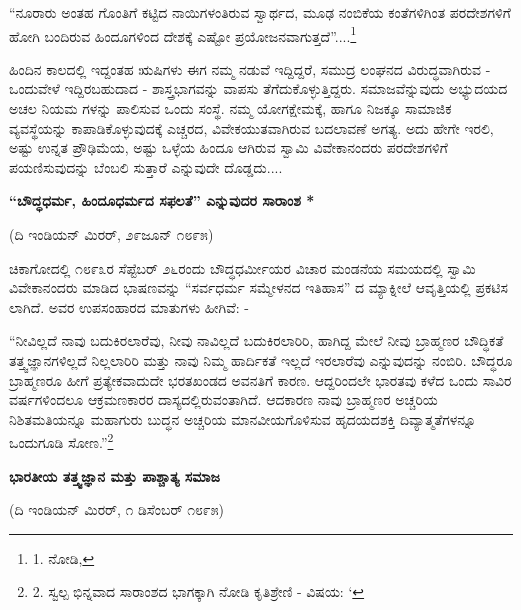“ನೂರಾರು ಅಂತಹ ಗೊಂತಿಗೆ ಕಟ್ಟಿದ ನಾಯಿಗಳಂತಿರುವ ಸ್ವಾರ್ಥದ, ಮೂಢ ನಂಬಿಕೆಯ ಕಂತೆಗಳಿಗಿಂತ ಪರದೇಶಗಳಿಗೆ ಹೋಗಿ ಬಂದಿರುವ ಹಿಂದೂಗಳಿಂದ ದೇಶಕ್ಕೆ ಎಷ್ಟೋ ಪ್ರಯೋಜನವಾಗುತ್ತದೆ”....\footnote{1. ನೋಡಿ, }

ಹಿಂದಿನ ಕಾಲದಲ್ಲಿ ಇದ್ದಂತಹ ಋಷಿಗಳು ಈಗ ನಮ್ಮ ನಡುವೆ ಇದ್ದಿದ್ದರೆ, ಸಮುದ್ರ ಲಂಘನದ ವಿರುದ್ಧವಾಗಿರುವ - ಒಂದುವೇಳೆ ಇದ್ದಿರಬಹುದಾದ - ಶಾಸ್ತ್ರಭಾಗವನ್ನು ವಾಪಸು ತೆಗೆದುಕೊಳ್ಳುತ್ತಿದ್ದರು. ಸಮಾಜವೆನ್ನುವುದು ಅಭ್ಯುದಯದ ಅಚಲ ನಿಯಮ ಗಳನ್ನು ಪಾಲಿಸುವ ಒಂದು ಸಂಸ್ಥೆ. ನಮ್ಮ ಯೋಗಕ್ಷೇಮಕ್ಕೆ, ಹಾಗೂ ನಿಜಕ್ಕೂ ಸಾಮಾಜಿಕ ವ್ಯವಸ್ಥೆಯನ್ನು ಕಾಪಾಡಿಕೊಳ್ಳುವುದಕ್ಕೆ ಎಚ್ಚರದ, ವಿವೇಕಯುತವಾಗಿರುವ ಬದಲಾವಣೆ ಅಗತ್ಯ. ಅದು ಹೇಗೇ ಇರಲಿ, ಅಷ್ಟು ಉನ್ನತ ಪ್ರೌಢಿಮೆಯ, ಅಷ್ಟು ಒಳ್ಳೆಯ ಹಿಂದೂ ಆಗಿರುವ ಸ್ವಾಮಿ ವಿವೇಕಾನಂದರು ಪರದೇಶಗಳಿಗೆ ಪಯಣಿಸುವುದನ್ನು ಬೆಂಬಲಿ ಸುತ್ತಾರೆ ಎನ್ನುವುದೇ ದೊಡ್ಡದು....

\begin{center}
\textbf{“ಬೌದ್ಧಧರ್ಮ, ಹಿಂದೂಧರ್ಮದ ಸಫಲತೆ” ಎನ್ನುವುದರ ಸಾರಾಂಶ *}
\end{center}

\begin{center}
(ದಿ ಇಂಡಿಯನ್ ಮಿರರ್, ೨೯ಜೂನ್ ೧೮೯೫)
\end{center}

ಚಿಕಾಗೋದಲ್ಲಿ ೧೮೯೩ರ ಸೆಪ್ಟೆಬರ್ ೨೬ರಂದು ಬೌದ್ಧಧರ್ಮೀಯರ ವಿಚಾರ ಮಂಡನೆಯ ಸಮಯದಲ್ಲಿ ಸ್ವಾಮಿ ವಿವೇಕಾನಂದರು ಮಾಡಿದ ಭಾಷಣವನ್ನು “ಸರ್ವಧರ್ಮ ಸಮ್ಮೇಳನದ ಇತಿಹಾಸ” ದ ಮ್ಯಾಕ್ನೀಲೆ ಆವೃತ್ತಿಯಲ್ಲಿ ಪ್ರಕಟಿಸ ಲಾಗಿದೆ. ಅವರ ಉಪಸಂಹಾರದ ಮಾತುಗಳು ಹೀಗಿವೆ: -

“ನೀವಿಲ್ಲದೆ ನಾವು ಬದುಕಿರಲಾರೆವು, ನೀವು ನಾವಿಲ್ಲದೆ ಬದುಕಿರಲಾರಿರಿ, ಹಾಗಿದ್ದ ಮೇಲೆ ನೀವು ಬ್ರಾಹ್ಮಣರ ಬೌದ್ಧಿಕತೆ ತತ್ತ್ವಜ್ಞಾನಗಳಿಲ್ಲದೆ ನಿಲ್ಲಲಾರಿರಿ ಮತ್ತು ನಾವು ನಿಮ್ಮ ಹಾರ್ದಿಕತೆ ಇಲ್ಲದೆ ಇರಲಾರೆವು ಎನ್ನುವುದನ್ನು ನಂಬಿರಿ. ಬೌದ್ಧರೂ ಬ್ರಾಹ್ಮಣರೂ ಹೀಗೆ ಪ್ರತ್ಯೇಕವಾದುದೇ ಭರತಖಂಡದ ಅವನತಿಗೆ ಕಾರಣ. ಆದ್ದರಿಂದಲೇ ಭಾರತವು ಕಳೆದ ಒಂದು ಸಾವಿರ ವರ್ಷಗಳಿಂದಲೂ ಆಕ್ರಮಣಕಾರರ ದಾಸ್ಯದಲ್ಲಿರುವಂತಾಗಿದೆ. ಆದಕಾರಣ ನಾವು ಬ್ರಾಹ್ಮಣರ ಅಚ್ಚರಿಯ ನಿಶಿತಮತಿಯನ್ನೂ ಮಹಾಗುರು ಬುದ್ಧನ ಅಚ್ಚರಿಯ ಮಾನವೀಯಗೊಳಿಸುವ ಹೃದಯದಶಕ್ತಿ ದಿವ್ಯಾತ್ಮತೆಗಳನ್ನೂ ಒಂದುಗೂಡಿ ಸೋಣ.”\footnote{2. ಸ್ವಲ್ಪ ಭಿನ್ನವಾದ ಸಾರಾಂಶದ ಭಾಗಕ್ಕಾಗಿ ನೋಡಿ ಕೃತಿಶ್ರೇಣಿ -  ವಿಷಯ: ‘ }

\begin{center}
\textbf{ಭಾರತೀಯ ತತ್ತ್ವಜ್ಞಾನ ಮತ್ತು ಪಾಶ್ಚಾತ್ಯ ಸಮಾಜ}
\end{center}

\begin{center}
(ದಿ ಇಂಡಿಯನ್ ಮಿರರ್, ೧ ಡಿಸೆಂಬರ್ ೧೮೯೫)
\end{center}


